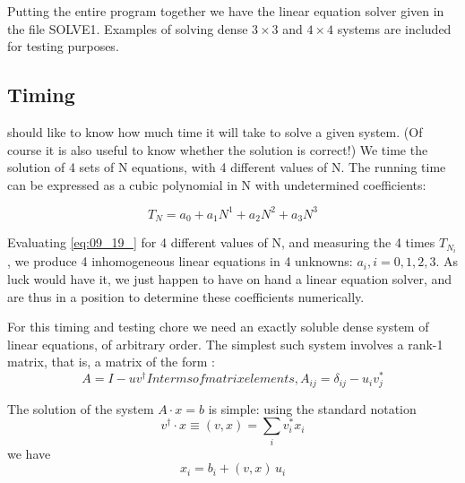 Putting the entire program together we have the linear equation
solver given in the file SOLVE1. Examples of solving dense $3\times 3$
and $4\times 4$ systems are included for testing purposes.

\subsection{Timing}
 should like to know how much time it will take to solve a 
given system. (Of course it is also useful to know whether the
solution is correct!) We time the solution of 4 sets of N equations,
with 4 different values of N. The running time can be expressed
as a cubic polynomial in N with undetermined coefficients:
\addtocounter{equation}{-3} %
\begin{equation}
    T_N=a_0+a_1N^1+a_2N^2+a_3N^3 \label{eq:09_19_}
\end{equation}

Evaluating \ref{eq:09_19_} for 4 different values of N, and measuring the 4
times $T_{N_i}$ , we produce 4 inhomogeneous linear equations in 4 
unknowns: $a_i , i = 0, 1, 2, 3$. As luck would have it, we just happen to have on hand a linear equation solver, and are thus in a
position to determine these coefficients numerically.

For this timing and testing chore we need an exactly soluble dense
system of linear equations, of arbitrary order. The simplest such
system involves a rank-1 matrix, that is, a matrix of the form :
\begin{subequations}
\begin{equation}
 \label{eq:09_20_}
A = I - u v^\dagger
\end{equation}
In terms of matrix elements,

\begin{equation}
 \label{eq:09_20prime_}
    A_{ij} = \delta_{ij} - u_i v_j^*
\end{equation}
\end{subequations}

The solution of the system $A\cdot x = b$ is simple: using the standard
notation
\begin{equation}
 \label{eq:09_21_}
    v^\dagger \cdot x \equiv (v,x) = \sum_{i}v_i^*x_i
\end{equation}
we have
\begin{equation}
 \label{eq:09_22_}
    x_i = b_i + (v,x)\,u_i
\end{equation}

